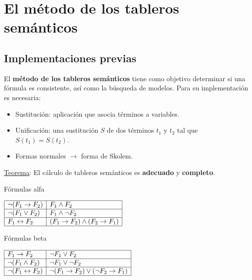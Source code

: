 \documentclass[aspectratio=169]{beamer}
\begin{document}
\section{El método de los tableros semánticos}
\subsection{Implementaciones previas}
\begin{frame}
  El \textbf{método de los tableros semánticos} tiene como objetivo determinar si una fórmula es consistente, así como la búsqueda de modelos. Para su implementación es necesaria:
  \begin{itemize}
  \item Sustitución: aplicación que asocia términos a variables.
  \item Unificación: una sustitución $S$ de dos términos $t_1$ y $t_2$ tal que $S(t_1)=S(t_2)$. 
  \item Formas normales $\longrightarrow$ forma de Skolem.
  \end{itemize}
\underline{Teorema}: El cálculo de tableros semánticos es \textbf{adecuado} y \textbf{completo}.  
\end{frame}

\begin{frame}[fragile]
\begin{center}
  Fórmulas alfa
\vspace{5mm}


   $\begin{array}{|l|l| } \hline
     \neg (F_1 \rightarrow F_2) & F_1 \wedge F_2               \\ \hline
     \neg(F_1 \vee F_2)         & F_1 \wedge \neg F_2          \\ \hline
     F_1 \leftrightarrow F_2    & (F_1 \rightarrow F_2) \wedge 
                                  (F_2 \rightarrow F_1)        \\ \hline
   \end{array}$
   \vspace{5mm}

Fórmulas beta

\vspace{5mm}
   $\begin{array}{|l|l|} \hline
    F_1 \rightarrow F_2             & \neg F_1 \vee F_2                \\ \hline
    \neg (F_1 \wedge F_2)           & \neg F_1 \vee \neg F_2           \\ \hline
    \neg (F_1 \leftrightarrow F_2)  & \neg (F_1 \rightarrow F_2 ) \vee 
                                      (\neg F_2 \rightarrow F_1)       \\ \hline
    \end{array}$
\end{center}

  
\end{frame}
\end{document}
